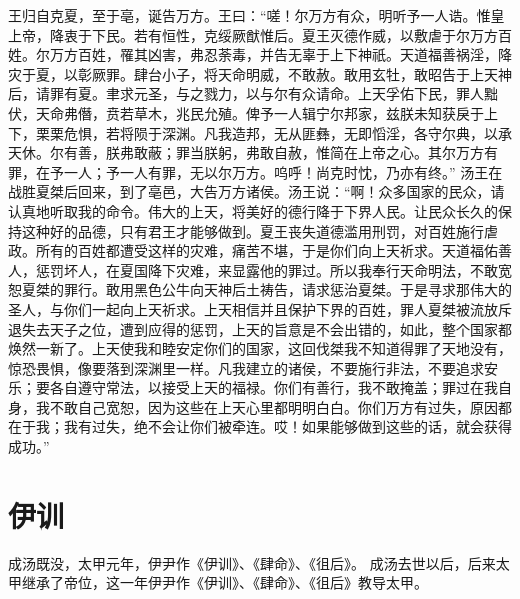 \documentclass[a4paper,12pt,UTF8,twoside]{ctexbook}
\begin{document}
王归自克夏，至于亳，诞告万方。王曰：“嗟！尔万方有众，明听予一人诰。惟皇上帝，降衷于下民。若有恒性，克绥厥猷惟后。夏王灭德作威，以敷虐于尔万方百姓。尔万方百姓，罹其凶害，弗忍荼毒，并告无辜于上下神祇。天道福善祸淫，降灾于夏，以彰厥罪。肆台小子，将天命明威，不敢赦。敢用玄牡，敢昭告于上天神后，请罪有夏。聿求元圣，与之戮力，以与尔有众请命。上天孚佑下民，罪人黜伏，天命弗僭，贲若草木，兆民允殖。俾予一人辑宁尔邦家，兹朕未知获戾于上下，栗栗危惧，若将陨于深渊。凡我造邦，无从匪彝，无即慆淫，各守尔典，以承天休。尔有善，朕弗敢蔽；罪当朕躬，弗敢自赦，惟简在上帝之心。其尔万方有罪，在予一人；予一人有罪，无以尔万方。呜呼！尚克时忱，乃亦有终。”
汤王在战胜夏桀后回来，到了亳邑，大告万方诸侯。汤王说：“啊！众多国家的民众，请认真地听取我的命令。伟大的上天，将美好的德行降于下界人民。让民众长久的保持这种好的品德，只有君王才能够做到。夏王丧失道德滥用刑罚，对百姓施行虐政。所有的百姓都遭受这样的灾难，痛苦不堪，于是你们向上天祈求。天道福佑善人，惩罚坏人，在夏国降下灾难，来显露他的罪过。所以我奉行天命明法，不敢宽恕夏桀的罪行。敢用黑色公牛向天神后土祷告，请求惩治夏桀。于是寻求那伟大的圣人，与你们一起向上天祈求。上天相信并且保护下界的百姓，罪人夏桀被流放斥退失去天子之位，遭到应得的惩罚，上天的旨意是不会出错的，如此，整个国家都焕然一新了。上天使我和睦安定你们的国家，这回伐桀我不知道得罪了天地没有，惊恐畏惧，像要落到深渊里一样。凡我建立的诸侯，不要施行非法，不要追求安乐；要各自遵守常法，以接受上天的福禄。你们有善行，我不敢掩盖；罪过在我自身，我不敢自己宽恕，因为这些在上天心里都明明白白。你们万方有过失，原因都在于我；我有过失，绝不会让你们被牵连。哎！如果能够做到这些的话，就会获得成功。”

\chapter{伊训}

成汤既没，太甲元年，伊尹作《伊训》、《肆命》、《徂后》。
成汤去世以后，后来太甲继承了帝位，这一年伊尹作《伊训》、《肆命》、《徂后》教导太甲。
\end{document}
